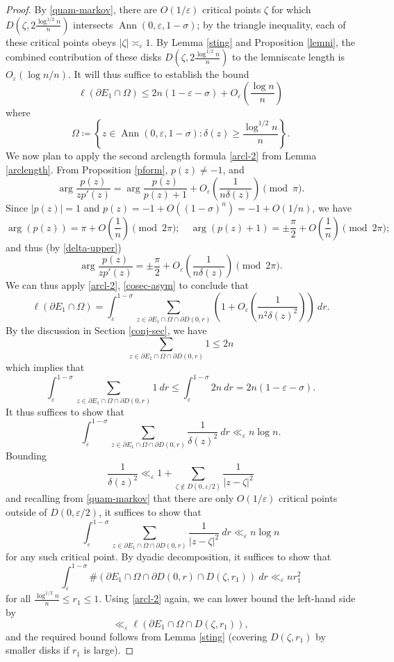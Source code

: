 \documentclass[12pt]{amsart}
\newcommand{\eps}{\varepsilon}
\renewcommand{\arg}{\operatorname{arg}}
\newcommand{\Ann}{\operatorname{Ann}}
\begin{document}
\begin{proof}
By \eqref{quam-markov}, there are $O(1/\eps)$ critical points $\zeta$ for which $D(\zeta, 2\frac{\log^{1/2} n}{n})$ intersects $\Ann(0,\eps,1-\sigma)$; by the triangle inequality, each of these critical points obeys $|\zeta| \asymp_\eps 1$.  By Lemma \ref{sting} and Proposition \ref{lemni}, the combined contribution of these disks $D(\zeta, 2\frac{\log^{1/2} n}{n})$ to the lemniscate length is $O_\eps(\log n/n)$.
It will thus suffice to establish the bound
$$ \ell(\partial E_1 \cap \Omega) \leq 2n (1-\eps-\sigma) + O_\eps\left(\frac{\log n}{n} \right)$$
where
$$ \Omega \coloneqq \left\{ z \in \Ann(0,\eps,1-\sigma): \delta(z) \geq \frac{\log^{1/2} n}{n} \right\}.$$
We now plan to apply the second arclength formula \eqref{arcl-2} from Lemma \ref{arclength}.
From Proposition \ref{pform}, $p(z) \neq -1$, and
$$ \arg \frac{p(z)}{zp'(z)} = \arg \frac{p(z)}{p(z)+1}
+ O_\eps\left(\frac{1}{n \delta(z)} \right) \pmod \pi.$$
Since $|p(z)|=1$ and $p(z) = -1 + O((1-\sigma)^n) = -1 + O(1/n)$, we have
$$ \arg(p(z)) = \pi + O\left(\frac{1}{n}\right) \pmod{2\pi}; \quad \arg(p(z)+1) = \pm \frac{\pi}{2} + O\left(\frac{1}{n}\right) \pmod{2\pi};$$
and thus (by \eqref{delta-upper})
$$ \arg \frac{p(z)}{zp'(z)} = \pm \frac{\pi}{2} + O_\eps\left(\frac{1}{n \delta(z)} \right) \pmod{2\pi}.$$
We can thus apply \eqref{arcl-2}, \eqref{cosec-asym} to conclude that
$$
 \ell(\partial E_1 \cap \Omega) = \int_\eps^{1-\sigma} \sum_{z \in \partial E_1 \cap \Omega \cap \partial D(0,r)} \left(1 + O_\eps\left( \frac{1}{n^2 \delta(z)^2} \right)\right)\ dr.
$$
By the discussion in Section \ref{conj-sec}, we have
$$ \sum_{z \in \partial E_1 \cap \Omega \cap \partial D(0,r)} 1 \leq 2n$$
which implies that
\begin{equation}\label{zero-use}
    \int_{\eps}^{1-\sigma}\sum_{z \in \partial E_1 \cap \Omega \cap \partial D(0,r)} 1 \ dr \leq \int_\eps^{1-\sigma} 2n\ dr = 2n(1-\eps-\sigma).
\end{equation}
It thus suffices to show that
\begin{equation}\label{ute}
     \int_\eps^{1-\sigma} \sum_{z \in \partial E_1 \cap \Omega \cap \partial D(0,r)} \frac{1}{\delta(z)^2}\ dr \ll_\eps n \log n.
\end{equation}
Bounding
$$ \frac{1}{\delta(z)^2} \ll_\eps 1 + \sum_{\zeta \notin D(0,\eps/2)} \frac{1}{|z - \zeta|^2}$$
and recalling from \eqref{quam-markov} that there are only $O(1/\eps)$ critical points outside of $D(0,\eps/2)$, it suffices to show that
$$ \int_\eps^{1-\sigma} \sum_{z \in \partial E_1 \cap \Omega \cap \partial D(0,r)} \frac{1}{|z - \zeta|^2}\ dr \ll_\eps n \log n$$
for any such critical point.  By dyadic decomposition, it suffices to show that
$$ \int_\eps^{1-\sigma} \# (\partial E_1 \cap \Omega \cap \partial D(0,r) \cap D(\zeta, r_1)) \ dr \ll_\eps n r_1^2$$
for all $\frac{\log^{1/2} n}{n} \leq r_1 \leq 1$.  Using \eqref{arcl-2} again, we can lower bound the left-hand side by
$$ \ll_\eps \ell( \partial E_1 \cap \Omega \cap D(\zeta,r_1)),$$
and the required bound follows from Lemma \ref{sting} (covering $D(\zeta,r_1)$ by smaller disks if $r_1$ is large).
\end{proof}
\end{document}
